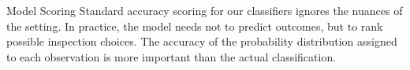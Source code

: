 


\vspace{-.7in}
\begin{block}{Model Scoring}
Standard accuracy scoring for our classifiers ignores
the nuances of the setting. In practice, the model
needs not to predict outcomes, but to rank possible
inspection choices. The accuracy of the 
probability distribution assigned to each observation
is more important than the actual classification.

\end{block}












